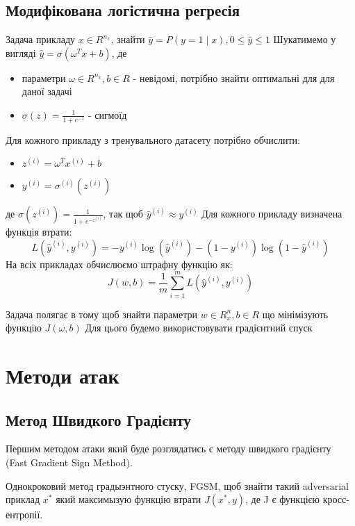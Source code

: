 \documentclass[a4paper,14pt]{extreport}
\newcommand{\tran}{^{T}}
\newcommand{\ith}{^{(i)}}
\begin{document}
	\section{Модифікована логістична регресія}
	Задача прикладу $x \in R^{n_x}$, знайти $\hat{y}=P(y = 1 \mid x), 0 \leq \hat{y} \leq 1$
	Шукатимемо у вигляді $\hat{y} = \sigma (\omega\tran x + b)$, де
	\begin{itemize}
		\item параметри $\omega \in R^{n_x}, b \in R$ - невідомі, потрібно знайти оптимальні для для даної задачі
		\item $\sigma(z) = \frac{1}{1+ e^{-z}}$ - сигмоїд
	\end{itemize}
	Для кожного прикладу з тренувального датасету потрібно обчислити:
	\begin{itemize}
		\item $ z\ith = \omega\tran x\ith + b $
		\item $ y\ith = \sigma\ith (z\ith) $
	\end{itemize}
	де $\sigma(z\ith) = \frac{1}{1 + e^{-z\ith}}$, так щоб $\hat{y}\ith \approx y\ith $ \newline
	Для кожного прикладу визначена функція втрати:
	$$L(\hat{y}\ith, y\ith) = -y\ith \log(\hat{y}\ith) - (1 - y\ith) \log(1 - \hat{y}\ith)$$
	На всіх прикладах обчислюємо штрафну функцію як:
	$$J(w, b) = \frac{1}{m} \sum_{i=1}^{m} L(\hat{y}\ith, y\ith)$$
	
	Задача полягає в тому щоб знайти параметри $w \in R^n_x, b\in R$ що мінімізують функцію $J(\omega, b)$
	Для цього будемо використовувати градієнтний спуск 
	
	
	


	\chapter{Методи атак} 
	\section{Метод Швидкого Градієнту} 
	Першим методом атаки який буде розглядатись є методу швидкого градієнту (Fast Gradient Sign Method).
	
	Однокроковий метод градыэнтного стуску, FGSM, щоб знайти такий adversarial приклад $x^{*}$ який максимызую функцію втрати $J(x^{*}, y)$, де J є функцією кросс-ентропії.
	
\end{document}
